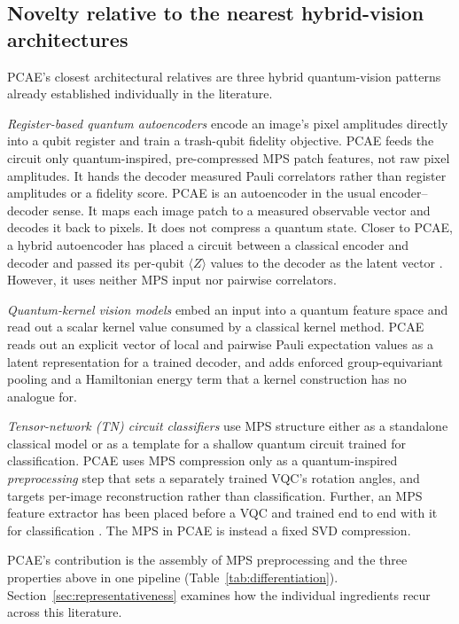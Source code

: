 \documentclass[pdflatex,sn-basic]{sn-jnl}
\begin{document}
\subsection*{Novelty relative to the nearest hybrid-vision architectures}

PCAE's closest architectural relatives are three hybrid quantum-vision patterns already established individually in the literature.

\emph{Register-based quantum autoencoders} \citep{Romero2017, WangQAECompression2024, QAEClassification2025} encode an image's pixel amplitudes directly into a qubit register and train a trash-qubit fidelity objective.
PCAE feeds the circuit only quantum-inspired, pre-compressed MPS patch features, not raw pixel amplitudes.
It hands the decoder measured Pauli correlators rather than register amplitudes or a fidelity score.
PCAE is an autoencoder in the usual encoder--decoder sense.
It maps each image patch to a measured observable vector and decodes it back to pixels.
It does not compress a quantum state.
Closer to PCAE, a hybrid autoencoder has placed a circuit between a classical encoder and decoder and passed its per-qubit $\langle Z\rangle$ values to the decoder as the latent vector \citep{Sakhnenko2022}.
However, it uses neither MPS input nor pairwise correlators.

\emph{Quantum-kernel vision models} \citep{Havlicek2019, QuantumKernelDefect2022} embed an input into a quantum feature space and read out a scalar kernel value consumed by a classical kernel method.
PCAE reads out an explicit vector of local and pairwise Pauli expectation values as a latent representation for a trained decoder, and adds enforced group-equivariant pooling and a Hamiltonian energy term that a kernel construction has no analogue for.

\emph{Tensor-network (TN) circuit classifiers} \citep{Guala2023, Stoudenmire2016, Han2018} use MPS structure either as a standalone classical model or as a template for a shallow quantum circuit trained for classification.
PCAE uses MPS compression only as a quantum-inspired \emph{preprocessing} step that sets a separately trained VQC's rotation angles, and targets per-image reconstruction rather than classification.
Further, an MPS feature extractor has been placed before a VQC and trained end to end with it for classification \citep{Chen2021MPSVQC}.
The MPS in PCAE is instead a fixed SVD compression.

PCAE's contribution is the assembly of MPS preprocessing and the three properties above in one pipeline (Table~\ref{tab:differentiation}).
Section~\ref{sec:representativeness} examines how the individual ingredients recur across this literature.
\end{document}
